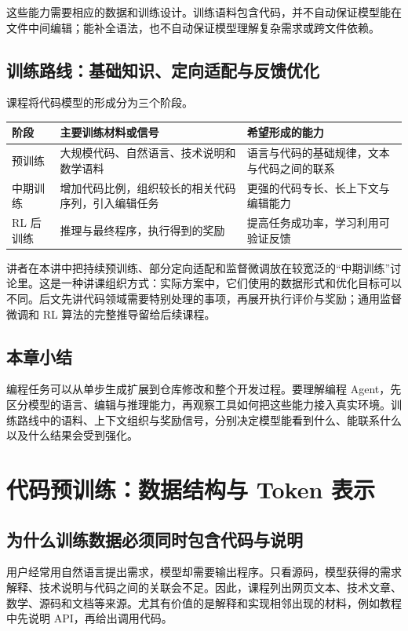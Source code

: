 \documentclass[11pt,a4paper]{article}
\begin{document}
这些能力需要相应的数据和训练设计。训练语料包含代码，并不自动保证模型能在文件中间编辑；能补全语法，也不自动保证模型理解复杂需求或跨文件依赖。

\subsection{训练路线：基础知识、定向适配与反馈优化}
课程将代码模型的形成分为三个阶段。
\begin{center}
\small
\begin{tabularx}{\textwidth}{L{2.5cm}XX}
\toprule
阶段 & 主要训练材料或信号 & 希望形成的能力 \\
\midrule
预训练 & 大规模代码、自然语言、技术说明和数学语料 & 语言与代码的基础规律，文本与代码之间的联系 \\
中期训练 & 增加代码比例，组织较长的相关代码序列，引入编辑任务 & 更强的代码专长、长上下文与编辑能力 \\
RL 后训练 & 推理与最终程序，执行得到的奖励 & 提高任务成功率，学习利用可验证反馈 \\
\bottomrule
\end{tabularx}
\end{center}

讲者在本讲中把持续预训练、部分定向适配和监督微调放在较宽泛的“中期训练”讨论里。这是一种讲课组织方式：实际方案中，它们使用的数据形式和优化目标可以不同。后文先讲代码领域需要特别处理的事项，再展开执行评价与奖励；通用监督微调和 RL 算法的完整推导留给后续课程。

\subsection{本章小结}
编程任务可以从单步生成扩展到仓库修改和整个开发过程。要理解编程 Agent，先区分模型的语言、编辑与推理能力，再观察工具如何把这些能力接入真实环境。训练路线中的语料、上下文组织与奖励信号，分别决定模型能看到什么、能联系什么以及什么结果会受到强化。

\clearpage
\section{代码预训练：数据结构与 Token 表示}
\subsection{为什么训练数据必须同时包含代码与说明}
用户经常用自然语言提出需求，模型却需要输出程序。只看源码，模型获得的需求解释、技术说明与代码之间的关联会不足。因此，课程列出网页文本、技术文章、数学、源码和文档等来源。尤其有价值的是解释和实现相邻出现的材料，例如教程中先说明 API，再给出调用代码。
\end{document}
